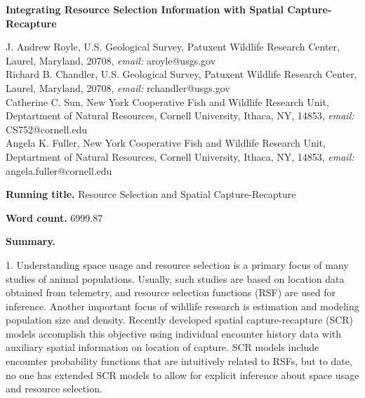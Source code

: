 \documentclass[12pt]{article}
\begin{document}
\begin{center}
\Large \textbf{
Integrating
Resource Selection Information with Spatial Capture-Recapture
}
\end{center}
%


\noindent J. Andrew Royle, U.S. Geological Survey, Patuxent
Wildlife Research Center, Laurel, Maryland, 20708,
\emph{email:} aroyle@usgs.gov \\

\noindent Richard B. Chandler,  U.S. Geological Survey, Patuxent
Wildlife Research Center, Laurel, Maryland, 20708,
\emph{email:} rchandler@usgs.gov \\

\noindent Catherine C.  Sun, New York Cooperative Fish and Wildlife
Research Unit, Deptartment of Natural Resources, Cornell
University, Ithaca, NY, 14853,
\emph{email:} CS752@cornell.edu \\

\noindent Angela K. Fuller, New York Cooperative Fish and Wildlife
Research Unit, Deptartment of Natural Resources, Cornell
University, Ithaca, NY, 14853,
\emph{email:} angela.fuller@cornell.edu \\

\vspace{.2in}

{\bf Running title.} Resource Selection and Spatial Capture-Recapture

\vspace{.2in}

{\bf Word count.} 6999.87  %

\vspace{.2in}

{\bf Summary.}

1.
Understanding space usage and resource selection is a primary focus of
many studies of animal populations. Usually, such studies are based on
location data obtained from telemetry,
and resource selection functions (RSF) are used for inference.
Another important focus of wildlife research is estimation and
modeling population size and density.
Recently developed spatial capture-recapture (SCR) models accomplish this objective
using individual encounter history data with auxiliary spatial information
on location of capture. SCR models include %
encounter probability functions that %
are intuitively related to RSFs, but %
to date, no one has extended
SCR models to allow for explicit inference about
space usage and resource selection.
\end{document}

